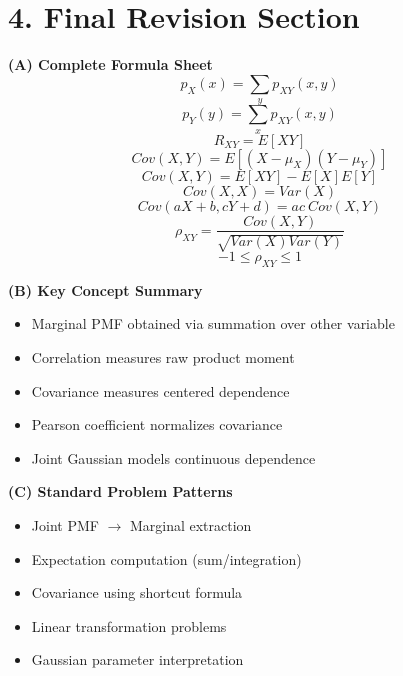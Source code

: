 \documentclass[12pt]{article}
\begin{document}
\hrulefill

\section*{4. Final Revision Section}

\textbf{(A) Complete Formula Sheet}
\[ \boxed{p_{X}(x)=\sum_{y}p_{XY}(x,y)} \]
\[ \boxed{p_{Y}(y)=\sum_{x}p_{XY}(x,y)} \]
\[ \boxed{R_{XY}=E[XY]} \]
\[ \boxed{Cov(X,Y)=E[(X-\mu_{X})(Y-\mu_{Y})]} \]
\[ \boxed{Cov(X,Y)=E[XY]-E[X]E[Y]} \]
\[ \boxed{Cov(X,X)=Var(X)} \]
\[ \boxed{Cov(aX+b,cY+d)=ac~Cov(X,Y)} \]
\[ \boxed{\rho_{XY}=\frac{Cov(X,Y)}{\sqrt{Var(X)Var(Y)}}} \]
\[ \boxed{-1 \le \rho_{XY} \le 1} \]

\textbf{(B) Key Concept Summary}
\begin{itemize}[noitemsep]
    \item Marginal PMF obtained via summation over other variable
    \item Correlation measures raw product moment
    \item Covariance measures centered dependence
    \item Pearson coefficient normalizes covariance
    \item Joint Gaussian models continuous dependence
\end{itemize}

\textbf{(C) Standard Problem Patterns}
\begin{itemize}[noitemsep]
    \item Joint PMF $\rightarrow$ Marginal extraction
    \item Expectation computation (sum/integration)
    \item Covariance using shortcut formula
    \item Linear transformation problems
    \item Gaussian parameter interpretation
\end{itemize}
\end{document}
